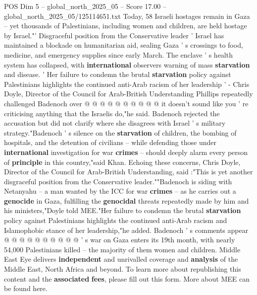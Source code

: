\begin{textsample}{POS Dim 5 – global\_north\_2025\_05 – Score 17.00 – global\_north\_2025\_05/125114651.txt}
Today, 58 Israeli hostages remain in Gaza -- yet thousands of Palestinians, including women and children, are held hostage by Israel."' Disgraceful position from the Conservative leader ' Israel has maintained a blockade on humanitarian aid, sealing Gaza ' s crossings to food, medicine, and emergency supplies since early March.
The enclave ' s health system has collapsed, with \textbf{international} observers warning of mass \textbf{starvation} and disease. ' Her failure to condemn the brutal \textbf{starvation} policy against Palestinians highlights the continued anti-Arab racism of her leadership ' - Chris Doyle, Director of the Council for Arab-British Understanding Phillips repeatedly challenged Badenoch over @ @ @ @ @ @ @ @ @ @ it doesn't sound like you ' re criticising anything that the Israelis do,"he said.
Badenoch rejected the accusation but did not clarify where she disagrees with Israel ' s military strategy."Badenoch ' s silence on the \textbf{starvation} of children, the bombing of hospitals, and the detention of civilians -- while defending those under \textbf{international} investigation for war \textbf{crimes} -- should deeply alarm every person of \textbf{principle} in this country,"said Khan.
Echoing these concerns, Chris Doyle, Director of the Council for Arab-British Understanding, said :"This is yet another disgraceful position from the Conservative leader.""Badenoch is siding with Netanyahu -- a man wanted by the ICC for war \textbf{crimes} -- as he carries out a \textbf{genocide} in Gaza, fulfilling the \textbf{genocidal} threats repeatedly made by him and his ministers,"Doyle told MEE."Her failure to condemn the brutal \textbf{starvation} policy against Palestinians highlights the continued anti-Arab racism and Islamophobic stance of her leadership,"he added.
Badenoch ' s comments appear @ @ @ @ @ @ @ @ @ @ ' s war on Gaza enters its 19th month, with nearly 54,000 Palestinians killed -- the majority of them women and children.
Middle East Eye delivers \textbf{independent} and unrivalled coverage and \textbf{analysis} of the Middle East, North Africa and beyond.
To learn more about republishing this content and the \textbf{associated} \textbf{fees}, please fill out this form.
More about MEE can be found here.

\end{textsample}
